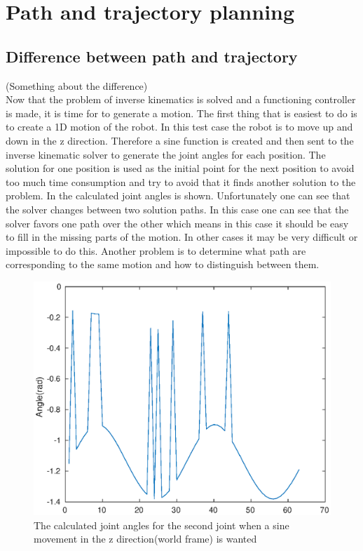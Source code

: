 \section*{Path and trajectory planning}
\subsection*{Difference between path and trajectory}
(Something about the difference)\\


Now that the problem of inverse kinematics is solved and a functioning controller is made, it is time for to generate a motion. The first thing that is easiest to do is to create a 1D motion of the robot. In this test case the robot is to move up and down in the z direction. Therefore a sine function is created and then sent to the inverse kinematic solver to generate the joint angles for each position. The solution for one position is used as the initial point for the next position to avoid too much time consumption and try to avoid that it finds another solution to the problem. In  the calculated joint angles is shown. Unfortunately one can see that the solver changes between two solution paths. In this case one can see that the solver favors one path over the other which means in this case it should be easy to fill in the missing parts of the motion. In other cases it may be very difficult or impossible to do this. Another problem is to determine what path are corresponding to the same motion and how to distinguish between them. 

\begin{figure}[htbp]
  \centering
  \includegraphics[width=.9\textwidth]{img/joint2SinMove.eps}
  \caption{The calculated joint angles for the second joint when a sine movement in the z direction(world frame) is wanted}
  \label{fig:joint2Sin}
\end{figure}

